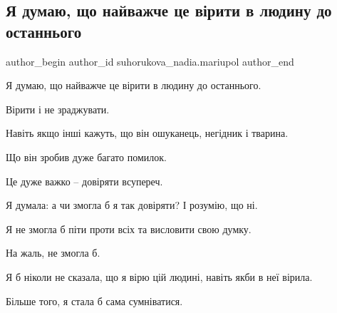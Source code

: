  
 
 
 
 

\subsection{Я думаю, що найважче це вірити в людину до останнього}
\label{sec:30_05_2023.fb.suhorukova_nadia.mariupol.1.ja_dumaju_scho_najvazhche_ce_viryty_v_ljudynu_do_ostannjogo}

\ifcmt
 author_begin
   author_id suhorukova_nadia.mariupol
 author_end
\fi

Я думаю, що найважче це вірити в людину до останнього.\par
Вірити  і не зраджувати. \par
Навіть якщо інші кажуть, що він ошуканець, негідник і тварина.\par
Що він зробив дуже багато помилок.\par
Це дуже важко – довіряти всупереч.\par
Я думала: а чи змогла б я так довіряти? І розумію, що ні.\par
Я не змогла б піти проти всіх та висловити свою думку.\par
На жаль, не змогла б.\par
Я б ніколи не сказала, що я вірю цій людині, навіть якби в неї вірила.\par
Більше того, я стала б сама сумніватися.\par


